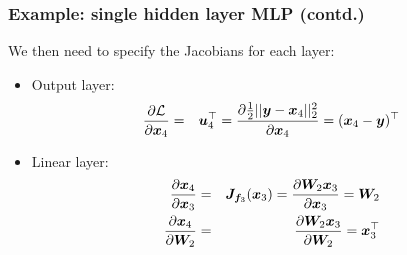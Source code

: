 \documentclass[smaller]{beamer}
\begin{document}
\begin{frame}
  \frametitle{Example: single hidden layer MLP (contd.)}\pause
We then need to specify the Jacobians for each layer:\pause
\begin{itemize}
\item Output layer:
  \begin{eqnarray}
    \frac{\partial{\mathcal L}}{\partial{\bm x_4}} &=& \bm u_4^{\top} = \frac{\partial{\frac12||\bm y - \bm x_4||_2^2}}{\partial{\bm x_4}} = (\bm x_4 - \bm y)^{\top}
  \end{eqnarray}
  \pause
  \item Linear layer:
    \begin{eqnarray}
    \frac{\partial{\bm x_4}}{\partial{\bm x_3}} &=& \bm J_{\bm f_3}(\bm x_3) = \frac{\partial{\bm W_2 \bm x_3}}{\partial{\bm x_3}} = \bm W_2 \\
    \frac{\partial{\bm x_4}}{\partial{\bm W_2}} &=& \frac{\partial{\bm W_2 \bm x_3}}{\partial{\bm W_2}} = \bm x_3^{\top}
  \end{eqnarray}
  \pause

\end{itemize} 
\end{frame}
\end{document}
